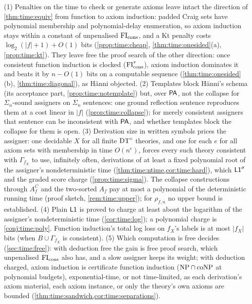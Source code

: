 \begin{remark}\label{rem:time:summary}
(1) Penalties on the time to check or generate axioms leave intact the direction of \cref{thm:time:equiv} from function to axiom induction: padded Craig sets have polynomial membership and polynomial-delay enumeration, so axiom induction stays within a constant of unpenalised $\mathrm{FI}_{\mathrm{cons}}$, and a Kt penalty costs $\log_2(|f|+1)+O(1)$ bits (\cref{prop:time:cheap}, \cref{thm:time:onesided}(a), \cref{prop:time:kt}). They leave free the proof search of the other direction: once consistent function induction is clocked ($\mathrm{FI}_{\mathrm{cons}}^\tau$), axiom induction dominates it and beats it by $n-O(1)$ bits on a computable sequence (\cref{thm:time:onesided}(b), \cref{thm:time:diagonal}), as H\"anni objected. (2) Templates block H\"anni's schema (its acceptance part, \cref{prop:time:notemplate}) but, over $\mathsf{PA}$, not the collapse for $\Sigma_n$-sound assigners on $\Sigma_n$ sentences: one ground reflection sentence reproduces them at a cost linear in $|f|$ (\cref{prop:time:collapse}); for merely consistent assigners that sentence can be inconsistent with $\mathsf{PA}$, and whether templates block the collapse for them is open. (3) Derivation size in written symbols prices the assigner: one decidable $X$ for all finite $\mathrm{DT}^{\circ}$ theories, and one for each $e$ for all axiom sets with membership in time $O(n^e)$, forces every such theory consistent with $\Gamma_{f_X}$ to use, infinitely often, derivations of at least a fixed polynomial root of the assigner's nondeterministic time (\cref{thm:time:ntime,cor:time:hard}), which $\mathord{\mathsf{L1}}^{\sigma}$ and the graded score charge (\cref{prop:time:sigma}). The collapse constructions through $A^C_f$ and the two-sorted $A_f$ pay at most a polynomial of the deterministic running time (proof sketch, \cref{rem:time:upper}); for $\rho_{f,n}$ no upper bound is established. (4) Plain $\mathord{\mathsf{L1}}$ is proved to charge at least about the logarithm of the assigner's nondeterministic time (\cref{cor:time:log}); a polynomial charge is \cref{conj:time:poly}. Function induction's total log loss on $f_X$'s labels is at most $|f_X|$ bits (when $B\cup\Gamma_{f_X}$ is consistent). (5) Which computation is free decides (\cref{sec:time:free}): with deduction free the gain is free proof search, which unpenalised $\mathrm{FI}_{\mathrm{cons}}$ also has, and a slow assigner keeps its weight; with deduction charged, axiom induction is certificate function induction ($\mathrm{NP}\cap\mathrm{coNP}$ at polynomial budgets), exponential-time, or not time-limited, as each derivation's axiom material, each axiom instance, or only the theory's own axioms are bounded (\cref{thm:time:sandwich,cor:time:separations}).
\end{remark}

